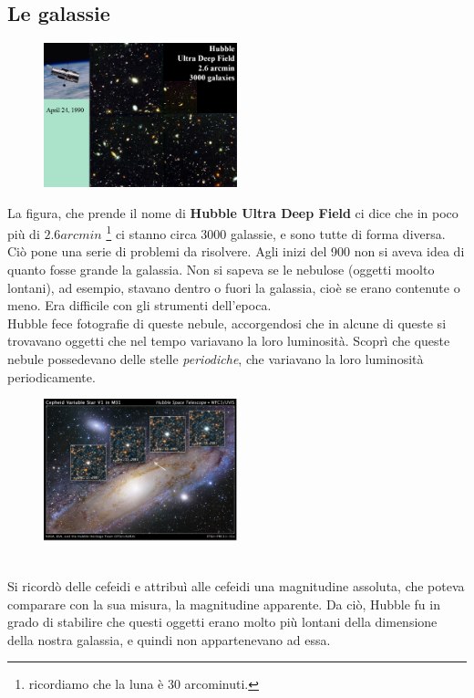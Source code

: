 \documentclass[a4paper,11pt]{article}
\begin{document}
\subsection{Le galassie}
\begin{figure} [h]
        \centering
        \includegraphics[width=0.5\textwidth]{immagini_lezioni12-12/hubble ultra deep field.png}
        \label{}
    \end{figure}
La figura, che prende il nome di \textbf{Hubble Ultra Deep Field} ci dice che in poco più di $2.6 arcmin$ \footnote{ricordiamo che la luna è 30 arcominuti.} ci stanno circa $3000$ galassie, e sono tutte di forma diversa. Ciò pone una serie di problemi da risolvere. 
Agli inizi del 900 non si aveva idea di quanto fosse grande la galassia. Non si sapeva se le nebulose (oggetti moolto lontani), ad esempio, stavano dentro o fuori la galassia, cioè se erano contenute o meno. Era difficile con gli strumenti dell'epoca.\\
Hubble fece fotografie di queste nebule, accorgendosi che in alcune di queste si trovavano oggetti che nel tempo variavano la loro luminosità. Scoprì che queste nebule possedevano delle stelle \textit{periodiche}, che variavano la loro luminosità periodicamente. 
\begin{figure} [h]
        \centering
        \includegraphics[width=0.5\textwidth]{immagini_lezioni12-12/stelle variabili.png}
        \label{}
    \end{figure}\\
Si ricordò delle cefeidi e attribuì alle cefeidi una magnitudine assoluta, che poteva comparare con la sua misura, la magnitudine apparente. Da ciò, Hubble fu in grado di stabilire che questi oggetti erano molto più lontani della dimensione della nostra galassia, e quindi non appartenevano ad essa. \\
\end{document}
